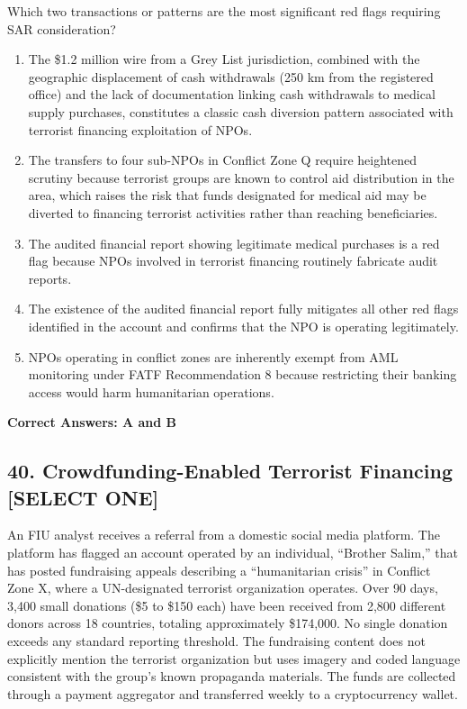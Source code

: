 \documentclass[11pt,a4paper]{article}
\begin{document}
	Which two transactions or patterns are the most significant red flags requiring SAR consideration?
	
	\begin{enumerate}[label=\Alph*.]
		\item The \$1.2 million wire from a Grey List jurisdiction, combined with the geographic displacement of cash withdrawals (250 km from the registered office) and the lack of documentation linking cash withdrawals to medical supply purchases, constitutes a classic cash diversion pattern associated with terrorist financing exploitation of NPOs.
		\item The transfers to four sub-NPOs in Conflict Zone Q require heightened scrutiny because terrorist groups are known to control aid distribution in the area, which raises the risk that funds designated for medical aid may be diverted to financing terrorist activities rather than reaching beneficiaries.
		\item The audited financial report showing legitimate medical purchases is a red flag because NPOs involved in terrorist financing routinely fabricate audit reports.
		\item The existence of the audited financial report fully mitigates all other red flags identified in the account and confirms that the NPO is operating legitimately.
		\item NPOs operating in conflict zones are inherently exempt from AML monitoring under FATF Recommendation 8 because restricting their banking access would harm humanitarian operations.
	\end{enumerate}
	\textbf{Correct Answers: A and B}
	
	\subsection{40. Crowdfunding-Enabled Terrorist Financing \textnormal{[SELECT ONE]}}
	
	An FIU analyst receives a referral from a domestic social media platform. The platform has flagged an account operated by an individual, ``Brother Salim,'' that has posted fundraising appeals describing a ``humanitarian crisis'' in Conflict Zone X, where a UN-designated terrorist organization operates. Over 90 days, 3,400 small donations (\$5 to \$150 each) have been received from 2,800 different donors across 18 countries, totaling approximately \$174,000. No single donation exceeds any standard reporting threshold. The fundraising content does not explicitly mention the terrorist organization but uses imagery and coded language consistent with the group's known propaganda materials. The funds are collected through a payment aggregator and transferred weekly to a cryptocurrency wallet.
	
\end{document}
